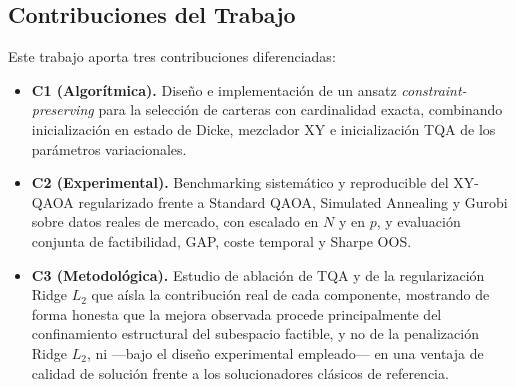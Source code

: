 \begin{table}[htbp]
    \centering
    \caption{Dimensión del espacio de soluciones según la formulación matemática y el confinamiento del espacio de estados.}
    \label{tab:dimension_espacio}
\end{table}

\subsection{Contribuciones del Trabajo}

Este trabajo aporta tres contribuciones diferenciadas:

\begin{itemize}
    \item \textbf{C1 (Algorítmica).} Diseño e implementación de un ansatz
    \emph{constraint-preserving} para la selección de carteras con cardinalidad exacta,
    combinando inicialización en estado de Dicke, mezclador XY e inicialización TQA de
    los parámetros variacionales.

    \item \textbf{C2 (Experimental).} Benchmarking sistemático y reproducible del
    XY-QAOA regularizado frente a Standard QAOA, Simulated Annealing y Gurobi sobre
    datos reales de mercado, con escalado en $N$ y en $p$, y evaluación conjunta de
    factibilidad, GAP, coste temporal y Sharpe OOS.

    \item \textbf{C3 (Metodológica).} Estudio de ablación
    de TQA y de la regularización Ridge $L_2$ que aísla la contribución real de cada
    componente, mostrando de forma honesta que la mejora observada procede
    principalmente del confinamiento estructural del subespacio factible, y no de la
    penalización Ridge $L_2$, ni —bajo el diseño experimental empleado— en una ventaja
    de calidad de solución frente a los solucionadores clásicos de referencia.
\end{itemize}

